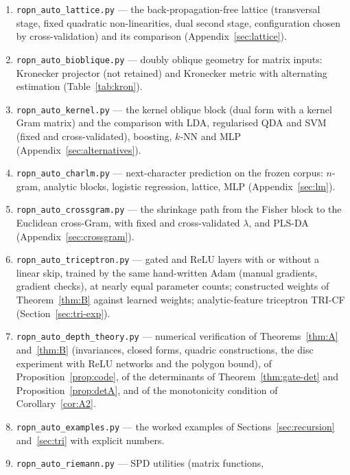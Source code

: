 \documentclass[11pt,a4paper]{article}
\theoremstyle{plain}
\theoremstyle{definition}
\theoremstyle{remark}
\begin{document}
\begin{enumerate}
  factorisation against the full GEVD reference (Table~\ref{tab:fast}) and
  against scikit-learn's LDA solvers (Table~\ref{tab:fast-lda}), and test of
  the online update.
  \item \texttt{ropn\_auto\_lattice.py} --- the back-propagation-free lattice
  (transversal stage, fixed quadratic non-linearities, dual second stage,
  configuration chosen by cross-validation) and its comparison
  (Appendix~\ref{sec:lattice}).
  \item \texttt{ropn\_auto\_bioblique.py} --- doubly oblique geometry for
  matrix inputs: Kronecker projector (not retained) and Kronecker metric
  with alternating estimation (Table~\ref{tab:kron}).
  \item \texttt{ropn\_auto\_kernel.py} --- the kernel oblique block (dual form
  with a kernel Gram matrix) and the comparison with LDA, regularised QDA
  and SVM (fixed and cross-validated), boosting, $k$-NN and MLP
  (Appendix~\ref{sec:alternatives}).
  \item \texttt{ropn\_auto\_charlm.py} --- next-character prediction on the
  frozen corpus: $n$-gram, analytic blocks, logistic regression, lattice,
  MLP (Appendix~\ref{sec:lm}).
  \item \texttt{ropn\_auto\_crossgram.py} --- the shrinkage path from the
  Fisher block to the Euclidean cross-Gram, with fixed and cross-validated
  $\lambda$, and PLS-DA (Appendix~\ref{sec:crossgram}).
  \item \texttt{ropn\_auto\_triceptron.py} --- gated and ReLU layers with or
  without a linear skip, trained by the same hand-written Adam (manual
  gradients, gradient checks), at nearly equal parameter counts;
  constructed weights of Theorem~\ref{thm:B} against learned weights;
  analytic-feature triceptron TRI-CF (Section~\ref{sec:tri-exp}).
  \item \texttt{ropn\_auto\_depth\_theory.py} --- numerical verification of
  Theorems~\ref{thm:A} and~\ref{thm:B} (invariances, closed forms, quadric
  constructions, the disc experiment with ReLU networks and the polygon
  bound), of Proposition~\ref{prop:code}, of the determinants of
  Theorem~\ref{thm:gate-det} and Proposition~\ref{prop:detA}, and of the
  monotonicity condition of Corollary~\ref{cor:A2}.
  \item \texttt{ropn\_auto\_examples.py} --- the worked examples of
  Sections~\ref{sec:recursion} and~\ref{sec:tri} with explicit numbers.
  \item \texttt{ropn\_auto\_riemann.py} --- SPD utilities (matrix functions,

\end{enumerate}
\end{document}
